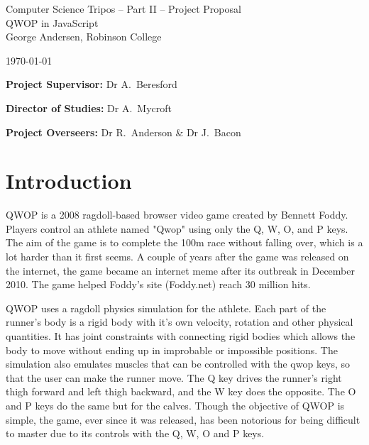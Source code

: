 \documentclass[12pt,a4paper,twoside]{article}
\begin{document}
\begin{center}
\Large
Computer Science Tripos -- Part II -- Project Proposal\\[4mm]
\LARGE
QWOP in JavaScript \\[4mm]

\large
George Andersen, Robinson College

\today

\end{center}

\vspace{5mm}

\textbf{Project Supervisor:} Dr A.~Beresford

\textbf{Director of Studies:} Dr A.~Mycroft

\textbf{Project Overseers:} Dr R.~Anderson \& Dr J.~Bacon


\section*{Introduction}

QWOP is a 2008 ragdoll-based browser video game created by Bennett Foddy. Players control an athlete named "Qwop" using only the Q, W, O, and P keys. The aim of the game is to complete the 100m race without falling over, which is a lot harder than it first seems.
A couple of years after the game was released on the internet, the game became an internet meme after its outbreak in December 2010. The game helped Foddy's site (Foddy.net) reach 30 million hits.

QWOP uses a ragdoll physics simulation for the athlete. Each part of the runner's body is a rigid body with it's own velocity, rotation and other physical quantities. It has joint constraints with connecting rigid bodies which allows the body to move without ending up in improbable or impossible positions.
The simulation also emulates muscles that can be controlled with the qwop keys, so that the user can make the runner move. The Q key drives the runner's right thigh forward and left thigh backward, and the W key does the opposite. The O and P keys do the same but for the calves.
Though the objective of QWOP is simple, the game, ever since it was released, has been notorious for being difficult to master due to its controls with the Q, W, O and P keys.

\end{document}
